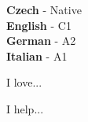 \documentclass[9pt]{cv}
\begin{document}
\begin{minipage}[t]{0.3\textwidth}
	\vspace{-\baselineskip} %


	\textbf{Czech} - Native\\
	\textbf{English} - C1\\
	\textbf{German} - A2\\
	\textbf{Italian} - A1\\
\end{minipage}
\hfill
\begin{minipage}[t]{0.3\textwidth}
	\vspace{-\baselineskip} %
	
	
	I love... \lorem
\end{minipage}
\hfill
\begin{minipage}[t]{0.3\textwidth}
	\vspace{-\baselineskip} %
	
	
	I help... \lorem
\end{minipage}
\end{document}
